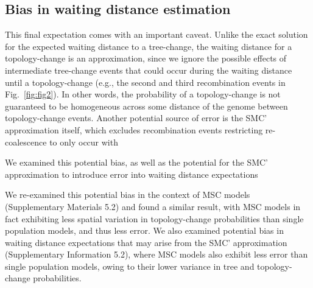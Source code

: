 \documentclass[11pt]{article}
\begin{document}
\subsection{Bias in waiting distance estimation}
This final expectation comes with an important caveat. 
Unlike the exact solution for the expected waiting distance to a 
tree-change, the waiting distance for a topology-change is an
approximation, since we ignore the possible effects of intermediate 
tree-change events that could occur during the waiting distance until 
a topology-change 
(e.g., the second and third recombination events in Fig.~\ref{fig:fig2}).
In other words, the probability of a topology-change is not guaranteed to
be homogeneous across some distance of the genome between topology-change
events. 
Another potential source of error is the SMC' approximation itself, 
which excludes recombination events 
restricting re-coalescence to only occur with 

We examined this potential bias, as well as the potential for the
SMC' approximation to introduce error into waiting distance expectations


We re-examined this potential bias in the context of MSC models 
(Supplementary Materials 5.2) and found a similar result, 
with MSC models in fact exhibiting less spatial variation in 
topology-change probabilities than single population models, and 
thus less error. We also examined potential bias in waiting distance 
expectations that may arise from the SMC' approximation 
(Supplementary Information 5.2), where MSC models also exhibit less 
error than single population models, owing to their lower variance 
in tree and topology-change probabilities.
\end{document}
